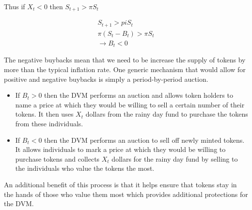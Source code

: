 Thus if $X_t < 0$ then $S_{t+1} > \pi S_t$

\begin{align*}
  S_{t+1} > pi S_t \\
  \pi (S_t - B_t) > \pi S_t \\
  \rightarrow B_t < 0
\end{align*}

The negative buybacks mean that we need to be increase the supply of tokens by more than the typical
inflation rate. One generic mechanism that would allow for positive and negative buybacks is simply
a period-by-period auction.

\begin{itemize}
  \item If $B_t > 0$ then the DVM performs an auction and allows token holders to name a price at
        which they would be willing to sell a certain number of their tokens. It then uses $X_t$
        dollars from the rainy day fund to purchase the tokens from these individuals.
  \item If $B_t < 0$ then the DVM performs an auction to sell off newly minted tokens. It allows
        individuals to mark a price at which they would be willing to purchase tokens and collects
        $X_t$ dollars for the rainy day fund by selling to the individuals who value the tokens
        the most.
\end{itemize}

An additional benefit of this process is that it helps ensure that tokens stay in the hands of those
who value them most which provides additional protections for the DVM.
